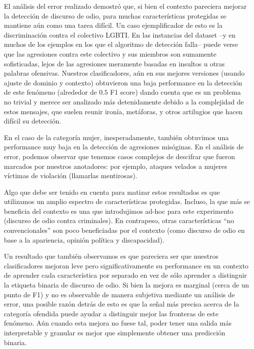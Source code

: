 El análisis del error realizado demostró que, si bien el contexto pareciera mejorar la detección de discurso de odio, para muchas características protegidas se mantiene aún como una tarea difícil. Un caso ejemplificador de esto es la discriminación contra el colectivo LGBTI. En las instancias del dataset --y en muchos de los ejemplos en los que el algoritmo de detección falla--  puede verse que las agresiones contra este colectivo y sus miembros son sumamente sofisticadas, lejos de las agresiones meramente basadas en insultos u otras palabras ofensivas. Nuestros clasificadores, aún en sus mejores versiones (usando ajuste de dominio y contexto) obtuvieron una baja performance en la detección de este fenómeno (alrededor de $0.5$ F1 score) dando cuenta que es un problema no trivial y merece ser analizado más detenidamente debido a la complejidad de estos mensajes, que suelen reunir ironía, metáforas, y otros artilugios que hacen difícil su detección.

En el caso de la categoría mujer, inesperadamente, también obtuvimos una performance muy baja en la detección de agresiones misóginas. En el análisis de error, podemos observar que tenemos casos complejos de descifrar que fueron marcados por nuestros anotadores: por ejemplo, ataques velados a mujeres víctimas de violación (llamarlas mentirosas). 

Algo que debe ser tenido en cuenta para matizar estos resultados es que utilizamos un amplio espectro de características protegidas. Incluso, la que más se beneficia del contexto es una que introdujimos ad-hoc para este experimento (discurso de odio contra criminales). En contrapeso, otras características ``no convencionales'' son poco beneficiadas por el contexto (como discurso de odio en base a la apariencia, opinión política y discapacidad).

Un resultado que también observamos es que pareciera ser que nuestros clasificadores mejoran leve pero significativamente su performance en un contexto de aprender cada característica por separado en vez de sólo aprender a distinguir la etiqueta binaria de discurso de odio. Si bien la mejora es marginal (cerca de un punto de F1) y no es observable de manera subjetiva mediante un análisis de error, una posible razón detrás de esto es que la señal más precisa acerca de la categoría ofendida puede ayudar a distinguir mejor las fronteras de este fenómeno. Aún cuando esta mejora no fuese tal, poder tener una salida más interpretable y granular es mejor que simplemente obtener una predicción binaria.

